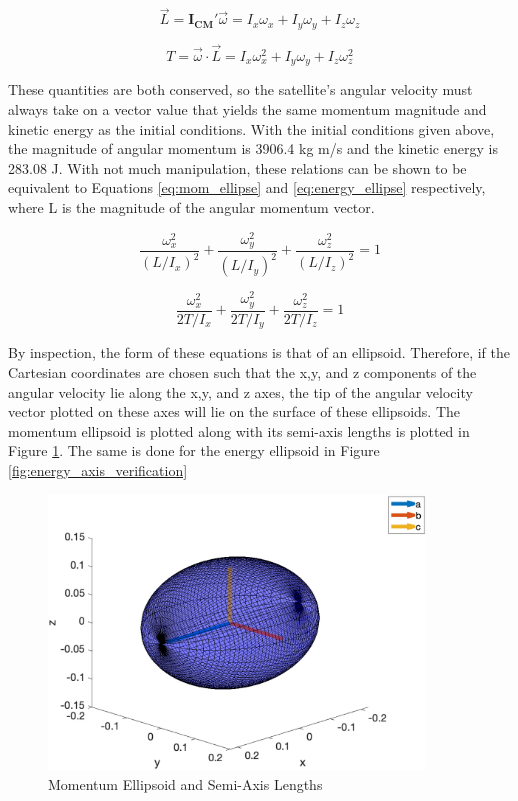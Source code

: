 \begin{equation} \label{eq:ang_mom}
    \vec{L} = \boldsymbol{I_{CM}'}\vec{\omega} = I_x \omega_x + I_y \omega_y + I_z \omega_z
\end{equation}

\begin{equation} \label{eq:rot_KE}
    T = \vec{\omega} \cdot \vec{L} = I_x \omega_x^2 + I_y \omega_y + I_z \omega_z^2
\end{equation}

These quantities are both conserved, so the satellite's angular velocity must always take on a vector value that yields the same momentum magnitude and kinetic energy as the initial conditions. With the initial conditions given above, the magnitude of angular momentum is 3906.4 kg m/s and the kinetic energy is 283.08 J. With not much manipulation, these relations can be shown to be equivalent to Equations \ref{eq:mom_ellipse} and \ref{eq:energy_ellipse} respectively, where L is the magnitude of the angular momentum vector.  

\begin{equation} \label{eq:mom_ellipse}
    \frac{\omega_x^2}{(L/I_x)^2} + \frac{\omega_y^2}{(L/I_y)^2} + \frac{\omega_z^2}{(L/I_z)^2} = 1
\end{equation}

\begin{equation} \label{eq:energy_ellipse}
    \frac{\omega_x^2}{2T/I_x} + \frac{\omega_y^2}{2T/I_y} + \frac{\omega_z^2}{2T/I_z} = 1
\end{equation}

By inspection, the form of these equations is that of an ellipsoid. Therefore, if the Cartesian coordinates are chosen such that the x,y, and z components of the angular velocity lie along the x,y, and z axes, the tip of the angular velocity vector plotted on these axes will lie on the surface of these ellipsoids. The momentum ellipsoid is plotted along with its semi-axis lengths is plotted in Figure \ref{fig:momentum_axis_verification}. The same is done for the energy ellipsoid in Figure \ref{fig:energy_axis_verification}

\begin{figure}[H]
    \centering
    \includegraphics[width = 10cm]{Images/momentum_axes_random.png}
    \caption{Momentum Ellipsoid and Semi-Axis Lengths}
    \label{fig:momentum_axis_verification}
\end{figure}

